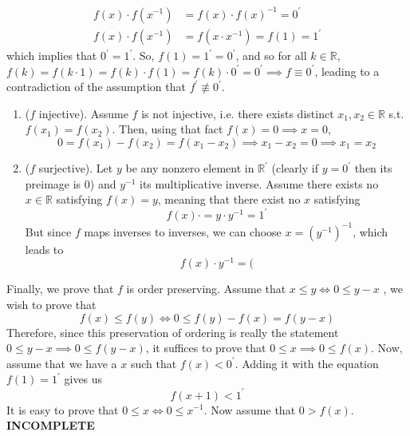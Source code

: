 \begin{solution}
\begin{align*}
      f(x) \cdot f(x^{-1}) & = f(x) \cdot f(x)^{-1} = 0^\prime \\
      f(x) \cdot f(x^{-1}) & = f(x \cdot x^{-1}) = f(1) = 1^\prime 
    \end{align*}
    which implies that $0^\prime = 1^\prime$. So, $f(1) = 1^\prime = 0^\prime$, and so for all $k \in \mathbb{R}$, $f(k) =f(k \cdot 1) = f(k) \cdot f(1) = f(k) \cdot 0^\prime = 0^\prime \implies f \equiv 0^\prime$, leading to a contradiction of the assumption that $f^\prime \not\equiv 0^\prime$. 
    \begin{enumerate}
      \item ($f$ injective). Assume $f$ is not injective, i.e. there exists distinct $x_1, x_2 \in \mathbb{R}$ s.t. $f(x_1) = f(x_2)$. Then, using that fact $f(x) = 0 \implies x = 0$, 
      \begin{equation}
        0 = f(x_1) - f(x_2) = f(x_1 - x_2) \implies x_1 - x_2 = 0 \implies x_1 = x_2
      \end{equation}
      \item ($f$ surjective). Let $y$ be any nonzero element in $\mathbb{R}^\prime$ (clearly if $y=0^\prime$ then its preimage is $0$) and $y^{-1}$ its multiplicative inverse. Assume there exists no $x \in \mathbb{R}$ satisfying $f(x) = y$, meaning that there exist no $x$ satisfying
      \begin{equation}
        f(x) \cdot  = y \cdot y^{-1} = 1^\prime
      \end{equation}
      But since $f$ maps inverses to inverses, we can choose $x = (y^{-1})^{-1}$, which leads to 
      \begin{equation}
        f(x) \cdot y^{-1} = (
      \end{equation}
    \end{enumerate}
    Finally, we prove that $f$ is order preserving. Assume that $x \leq y \iff 0 \leq y - x$ , we wish to prove that 
    \begin{equation}
      f(x) \leq f(y) \iff 0 \leq f(y) - f(x) = f(y - x)
    \end{equation}
    Therefore, since this preservation of ordering is really the statement $0 \leq y - x \implies 0 \leq f(y - x)$, it suffices to prove that $0 \leq x \implies 0 \leq f(x)$. Now, assume that we have a $x$ such that $f(x) < 0^\prime$. Adding it with the equation $f(1) = 1^\prime$ gives us 
    \begin{equation}
      f(x + 1) < 1^\prime
    \end{equation}
    It is easy to prove that $0 \leq x \iff 0 \leq x^{-1}$. Now assume that $0 > f(x)$. \textbf{INCOMPLETE}
  \end{solution}

